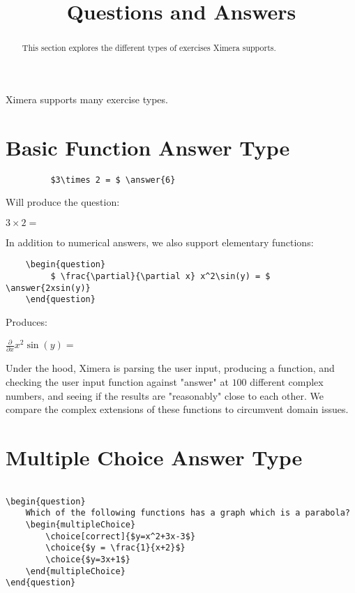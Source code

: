 \documentclass{ximera}
\title{Questions and Answers}
\begin{document}
	\begin{abstract}
		This section explores the different types of exercises Ximera supports. 
	\end{abstract}

\maketitle
	
Ximera supports many exercise types.
	
	
\section{Basic Function Answer Type}	
\begin{verbatim}
         $3\times 2 = $ \answer{6}
\end{verbatim}

Will produce the question:

\begin{question}
            $3\times 2 = $ 
\end{question}

In addition to numerical answers, we also support elementary functions:

\begin{verbatim}
    \begin{question}
         $ \frac{\partial}{\partial x} x^2\sin(y) = $ \answer{2xsin(y)}
    \end{question}
\end{verbatim}

Produces:

  \begin{question}
       $ \frac{\partial}{\partial x} x^2\sin(y) = $ 
  \end{question}
    
Under the hood, Ximera is parsing the user input, producing a function, and checking the user input function against "answer" at 
$100$ different complex numbers, and seeing if the results are "reasonably" close to each other.  
We compare the complex extensions of these functions to circumvent domain issues.

\section{Multiple Choice Answer Type}

\begin{verbatim}

\begin{question}
	Which of the following functions has a graph which is a parabola?
	\begin{multipleChoice}
		\choice[correct]{$y=x^2+3x-3$}
		\choice{$y = \frac{1}{x+2}$}
		\choice{$y=3x+1$}
	\end{multipleChoice}
\end{question}
\end{verbatim}
\end{document}

